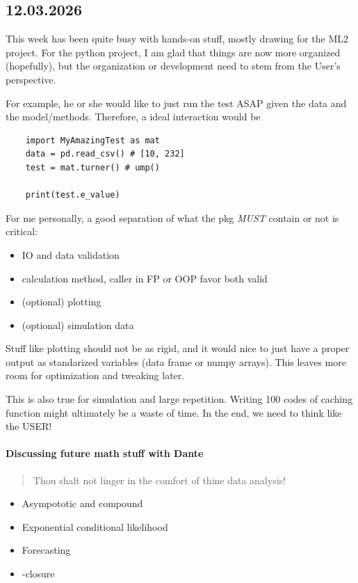 \subsection*{12.03.2026}

This week has been quite busy with hands-on stuff, mostly drawing for the ML2 project.
For the python project, I am glad that things are now more organized (hopefully), but the organization or development need to stem from the User's perspective.

For example, he or she would like to just run the test ASAP given the data and the model/methods.
Therefore, a ideal interaction would be
\begin{verbatim}
	import MyAmazingTest as mat
	data = pd.read_csv() # [10, 232]
	test = mat.turner() # ump()
	
	print(test.e_value)
\end{verbatim}

For me personally, a good separation of what the pkg \emph{MUST} contain or not is critical:
\begin{itemize}
	\item IO and data validation
	\item calculation method, caller in FP or OOP favor both valid
	\item (optional) plotting
	\item (optional) simulation data
\end{itemize}

Stuff like plotting should not be as rigid, and it would nice to just have a proper output as standarized variables (data frame or numpy arrays).
This leaves more room for optimization and tweaking later.

This is also true for simulation and large repetition.
Writing 100 codes of caching function might ultimately be a waste of time.
In the end, we need to think like the USER!

\paragraph*{Discussing future math stuff with Dante}

\begin{quote}
	Thou shalt not linger in the comfort of thine data analysis!
\end{quote}

\begin{itemize}
	\item Asympototic and compound \E
	\item Exponential conditional likelihood
	\item Forecasting
	\item \E-closure
\end{itemize}

